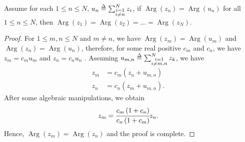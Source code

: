 \documentclass[conference]{IEEEtran}
\begin{document}
\begin{lem} \label{lemma_2}
    Assume for each $1\leq n\leq N$, $u_{n}\delequal \sum_{\substack{i=1\\i\neq n}}^{N}z_{i}$, if 
    $\operatorname{Arg}{\left(z_{n}\right)}=\operatorname{Arg}{\left(u_{n}\right)}$ for all $1\leq n\leq N$, then
    $\operatorname{Arg}{\left(z_{1}\right)}=\operatorname{Arg}{\left(z_{2}\right)}=\dots=\operatorname{Arg}{\left(z_{N}\right)}$.
\end{lem}
\begin{proof}
    For $1\leq m, n\leq N$ and $m\neq n$, we have $\operatorname{Arg}{(z_{m})}=\operatorname{Arg}{\left(u_{m}\right)}$ and $\operatorname{Arg}{\left(z_{n}\right)}=\operatorname{Arg}{\left(u_{n}\right)}$, therefore, for some real positive $c_{m}$ and $c_{n}$, we have $z_{m}=c_{m}u_{m}$ and $z_{n}=c_{n}u_{n}$ .
    Assuming $u_{m,n}\delequal \sum_{\substack{i=1\\i\neq m,n}}^{N}z_{k}$, we have
    \begin{align}
        z_{m}&=c_{m}\left(z_{n}+u_{m,n}\right)\label{eq:lemma_a}\\
        z_{n}&=c_{n}\left(z_{m}+u_{m,n}\right)\label{eq:lemma_b}.
    \end{align}
    After some algebraic manipulations, we obtain
    \begin{equation}
        z_{m}=\cfrac{c_{m}\left(1+c_{n}\right)}{c_{n}\left(1+c_{m}\right)}z_{n}.
    \end{equation}
    Hence, $\operatorname{Arg}{\left(z_{m}\right)}=\operatorname{Arg}{\left(z_{n}\right)}$ and the proof is complete.
\end{proof}



\end{document}
